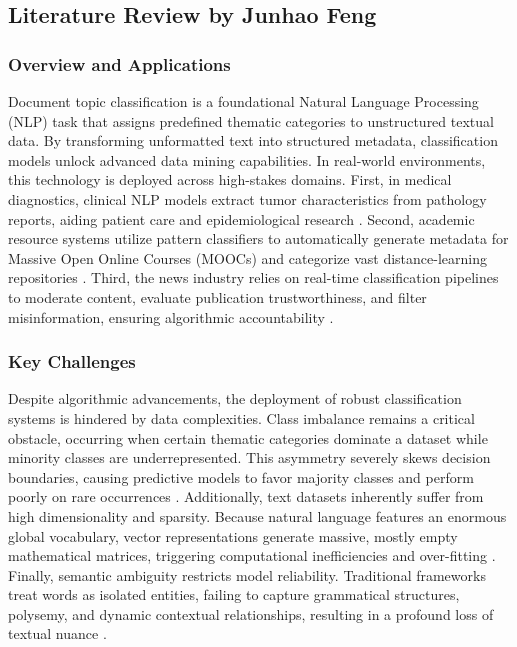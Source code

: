 \subsection{Literature Review by Junhao Feng}

\subsubsection{Overview and Applications}

Document topic classification is a foundational Natural Language Processing (NLP) task that assigns predefined thematic categories to unstructured textual data. By transforming unformatted text into structured metadata, classification models unlock advanced data mining capabilities. In real-world environments, this technology is deployed across high-stakes domains. First, in medical diagnostics, clinical NLP models extract tumor characteristics from pathology reports, aiding patient care and epidemiological research \cite{demner2021natural}. Second, academic resource systems utilize pattern classifiers to automatically generate metadata for Massive Open Online Courses (MOOCs) and categorize vast distance-learning repositories \cite{sebbaq2022fine}. Third, the news industry relies on real-time classification pipelines to moderate content, evaluate publication trustworthiness, and filter misinformation, ensuring algorithmic accountability \cite{shu2017fake}.

\subsubsection{Key Challenges}

Despite algorithmic advancements, the deployment of robust classification systems is hindered by data complexities. Class imbalance remains a critical obstacle, occurring when certain thematic categories dominate a dataset while minority classes are underrepresented. This asymmetry severely skews decision boundaries, causing predictive models to favor majority classes and perform poorly on rare occurrences \cite{karaman2026similarity}. Additionally, text datasets inherently suffer from high dimensionality and sparsity. Because natural language features an enormous global vocabulary, vector representations generate massive, mostly empty mathematical matrices, triggering computational inefficiencies and over-fitting \cite{joachims1998text}. Finally, semantic ambiguity restricts model reliability. Traditional frameworks treat words as isolated entities, failing to capture grammatical structures, polysemy, and dynamic contextual relationships, resulting in a profound loss of textual nuance \cite{devlin2019bert}.

